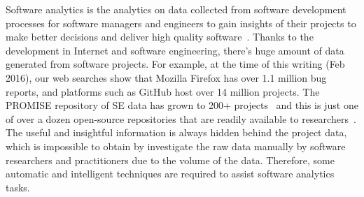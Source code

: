  Software analytics is the analytics on data collected from software development
 processes for software managers and engineers to gain insights of their projects
 to make better decisions and deliver high quality software~\cite{menzies2013software}.
 Thanks to the development in Internet and software engineering, there's huge amount
 of data generated from software projects. For example, at the time of this writing (Feb 2016),
 our web searches show that Mozilla Firefox has over 1.1 million bug reports, and
 platforms such as GitHub host over 14 million projects. The PROMISE repository
 of SE data has grown to 200+ projects~\cite{promise15} and this is just one of
 over a dozen open-source repositories that are readily available to researchers~\cite{rod12}.
 The useful and insightful information is always hidden behind the project data,
 which is impossible to obtain by investigate the raw data manually by software
 researchers and practitioners due to the volume of the data. Therefore, some
 automatic and intelligent techniques are required to assist software analytics tasks.
 
